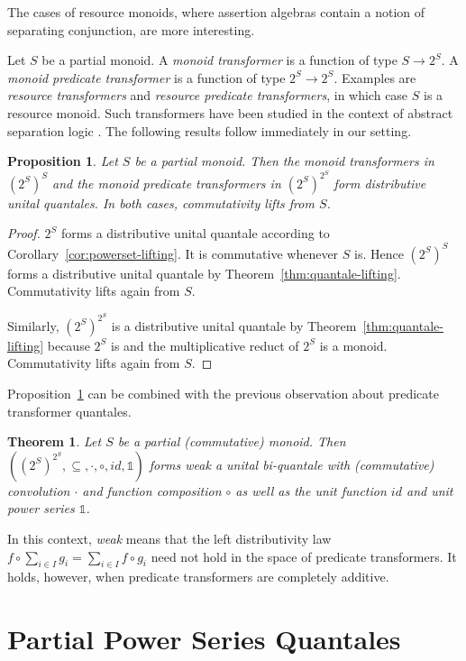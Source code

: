 \documentclass[12pt]{article}
\newtheorem{theorem}{Theorem}
\newtheorem{proposition}{Proposition}
\theoremstyle{definition}
\newcommand{\unit}{\mathbb{1}}
\begin{document}
The cases of resource monoids, where assertion algebras contain a
notion of separating conjunction, are more interesting.

Let $S$ be a partial monoid. A \emph{monoid transformer} is a function
of type $S\to 2^S$. A \emph{monoid predicate transformer} is a
function of type $2^S\to 2^S$. Examples are \emph{resource
  transformers} and \emph{resource predicate transformers}, in which
case $S$ is a resource monoid. Such transformers have been studied in
the context of abstract separation logic \cite{COY07}. The following
results follow immediately in our setting.
\begin{proposition}\label{prop:ptquantale}
  Let $S$ be a partial monoid. Then the monoid transformers in
  $(2^S)^S$ and the monoid predicate transformers in $(2^S)^{2^S}$
  form distributive unital quantales.  In both cases, commutativity
  lifts from $S$.
\end{proposition}
\begin{proof}
  $2^S$ forms a distributive unital quantale according to
  Corollary~\ref{cor:powerset-lifting}. It is commutative whenever $S$
  is. Hence $(2^S)^S$ forms a distributive unital quantale by
  Theorem~\ref{thm:quantale-lifting}. Commutativity lifts again from
  $S$.

  Similarly, $(2^S)^{2^S}$ is a distributive unital quantale by
  Theorem~\ref{thm:quantale-lifting} because $2^S$ is and the
  multiplicative reduct of $2^S$ is a monoid.  Commutativity lifts
  again from $S$.
\end{proof}

Proposition~\ref{prop:ptquantale} can be combined with the previous
observation about predicate transformer quantales.

\begin{theorem}\label{thm:ptbiquantale}
  Let $S$ be a partial (commutative) monoid. Then
  $((2^S)^{2^S},\subseteq,\cdot,\circ,\mathit{id},\unit)$ forms weak a
  unital bi-quantale with (commutative) convolution $\cdot$ and
  function composition $\circ$ as well as the unit function
  $\mathit{id}$ and unit power series $\unit$.
\end{theorem}
In this context, \emph{weak} means that the left distributivity law
$f\circ \sum_{i\in I} g_i = \sum_{i\in I} f\circ g_i$ need not hold in
the space of predicate transformers. It holds, however, when predicate
transformers are completely additive.



\section{Partial Power Series Quantales} 
\label{sec:partial-formal-power}
\end{document}
